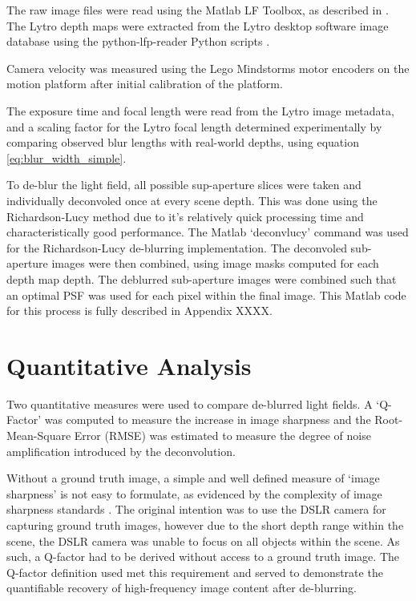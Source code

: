 The raw image files were read using the Matlab LF Toolbox, as described in \cite{dansereau2013toolbox}.
The Lytro depth maps were extracted from the Lytro desktop software image database using the python-lfp-reader Python scripts \cite{esfahbod2013python}.

Camera velocity was measured using the Lego Mindstorms motor encoders on the motion platform after initial calibration of the platform.

The exposure time and focal length were read from the Lytro image metadata, and a scaling factor for the Lytro focal length determined experimentally by comparing observed blur lengths with real-world depths, using equation \ref{eq:blur_width_simple}.

To de-blur the light field, all possible sup-aperture slices were taken and individually deconvoled once at every scene depth.
This was done using the Richardson-Lucy method due to it's relatively quick processing time and characteristically good performance.
The Matlab \enquote*{deconvlucy} command was used for the Richardson-Lucy de-blurring implementation.
The deconvoled sub-aperture images were then combined, using image masks computed for each depth map depth.
The deblurred sub-aperture images were combined such that an optimal PSF was used for each pixel within the final image.
This Matlab code for this process is fully described in Appendix XXXX.


\section{Quantitative Analysis}
\label{sec:quantitative_analysis}

Two quantitative measures were used to compare de-blurred light fields.
A \enquote*{Q-Factor} was computed to measure the increase in image sharpness and the Root-Mean-Square Error (RMSE) was estimated to measure the degree of noise amplification introduced by the deconvolution.

Without a ground truth image, a simple and well defined measure of \enquote*{image sharpness} is not easy to formulate, as evidenced by the complexity of image sharpness standards \cite{imatest2014sharpness}.
The original intention was to use the DSLR camera for capturing ground truth images, however due to the short depth range within the scene, the DSLR camera was unable to focus on all objects within the scene.
As such, a Q-factor had to be derived without access to a ground truth image.
The Q-factor definition used met this requirement and served to demonstrate the quantifiable recovery of high-frequency image content after de-blurring.

